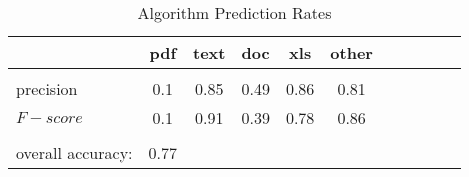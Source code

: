 \begin{table}[H]
\centering
\caption{Algorithm Prediction Rates}
\label{table:overall_results}
\colorbox{blue!25}{

\begin{tabular}{ l c c c c c c c c c c }
\hline
\hline

                 & pdf   &  text  &  doc  &  xls  & other\\ 
\hline
\\[0.2ex]
precision 		 & 0.1  &  0.85  & 0.49   & 0.86  & 0.81  \\[0.8ex]
$F-score$	 & 0.1  &  0.91  & 0.39   & 0.78  & 0.86    \\\\[0.8ex]

overall accuracy:  & 0.77 &  &  &     \\ [0.8ex]

\end{tabular}}
\end{table}